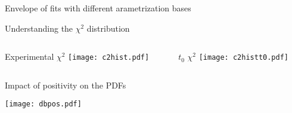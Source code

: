 \begin{frame}{Envelope of fits with different arametrization bases}
\end{frame}


\begin{frame}{Understanding the $\chi^2$ distribution}
    \begin{columns}
        \begin{column}[T]{0.48\textwidth}
            \centering
            Experimental $\chi^2$
            \texttt{[image: c2hist.pdf]}
        \end{column}
        \begin{column}[T]{0.48\textwidth}
            \centering
            $t_0$ $\chi^2$
            \texttt{[image: c2histt0.pdf]}
        \end{column}
    \end{columns}
\end{frame}


\begin{frame}[t]{Impact of positivity on the PDFs}
    \begin{center}
        \texttt{[image: dbpos.pdf]}
    \end{center}
\end{frame}



